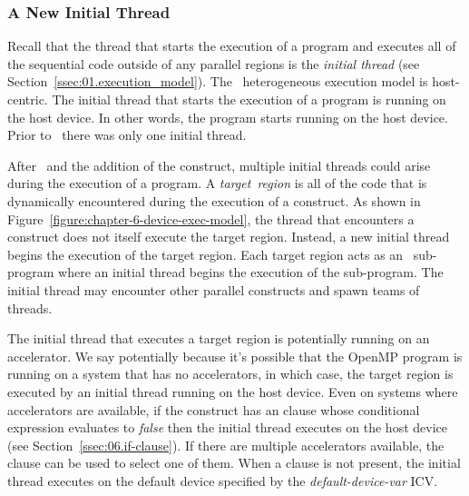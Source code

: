 \subsubsection{A New Initial Thread}
\label{ssec:06.initial-thread}

Recall that the thread that starts the execution of a program and executes all
of the sequential code outside of any parallel regions is the \emph{initial
thread} (see Section~\ref{ssec:01.execution_model}).  The \OMP\ heterogeneous
execution model is host-centric.  The initial thread that starts the execution
of a program is running on the host device.  In other words, the program starts
running on the host device.  Prior to \OMPfourzero\, there was only one initial thread.

\begin{figure*}[!tb]
\centering
{}
\caption{ \textbf{The heterogeneous programming model supported by OpenMP} -- \small
        Program execution begins on the host device.  When a host device
        thread encounters a \texttt{target} construct, a new initial thread 
        executes the target region.  When the initial thread encounters
        a \texttt{parallel} construct it becomes the master of a
        teams of threads.
        }
\label{figure:chapter-6-device-exec-model}
\end{figure*}

After \OMPfourzero\ and the addition of the  construct, multiple
initial threads could arise during the execution of a program.  A
\emph{target}~\emph{region} is all of the code that is dynamically encountered
during the execution of a  construct.  As shown in
Figure~\ref{figure:chapter-6-device-exec-model}, the thread that encounters a
 construct does not itself execute the target region.  Instead, a
new initial thread begins the execution of the target region.  Each
target region acts as an \OMP\ sub-program where an initial thread begins the
execution of the sub-program.  The initial thread may encounter
other parallel constructs and spawn teams of threads. 

The initial thread that executes a target region is potentially running on an
accelerator.  We say potentially because it's possible that the OpenMP
program is running on a system that has no accelerators, in which case, the
target region is executed by an initial thread running on the host device.
Even on systems where accelerators are available, if the 
construct has an  clause whose conditional expression evaluates to
\emph{false} then the initial thread executes on the host device (see
Section~\ref{ssec:06.if-clause}).  If there are multiple accelerators
available, the  clause %
can be used to select one of them.  When a  clause is not present,
the initial thread executes on the default device specified by the
\emph{default-device-var} ICV.

